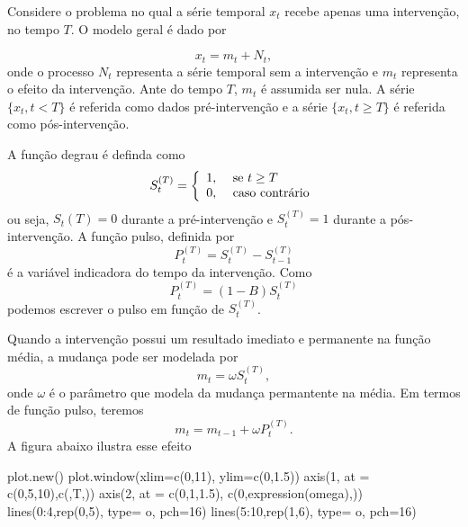 \documentclass[
  letterpaper,
  DIV=11,
  numbers=noendperiod]{scrartcl}
\newenvironment{Shaded}{\begin{snugshade}}{\end{snugshade}}
\newcommand{\AttributeTok}[1]{\textcolor[rgb]{0.40,0.45,0.13}{#1}}
\newcommand{\DecValTok}[1]{\textcolor[rgb]{0.68,0.00,0.00}{#1}}
\newcommand{\FloatTok}[1]{\textcolor[rgb]{0.68,0.00,0.00}{#1}}
\newcommand{\FunctionTok}[1]{\textcolor[rgb]{0.28,0.35,0.67}{#1}}
\newcommand{\NormalTok}[1]{\textcolor[rgb]{0.00,0.23,0.31}{#1}}
\newcommand{\SpecialCharTok}[1]{\textcolor[rgb]{0.37,0.37,0.37}{#1}}
\newcommand{\StringTok}[1]{\textcolor[rgb]{0.13,0.47,0.30}{#1}}
\theoremstyle{definition}
\theoremstyle{definition}
\theoremstyle{plain}
\theoremstyle{plain}
\theoremstyle{remark}
\begin{document}
Considere o problema no qual a série temporal \(x_t\) recebe apenas uma
intervenção, no tempo \(T\). O modelo geral é dado por

\[x_t=m_t+N_t,\] onde o processo \(N_t\) representa a série temporal sem
a intervenção e \(m_t\) representa o efeito da intervenção. Ante do
tempo \(T\), \(m_t\) é assumida ser nula. A série \(\{x_t,t<T\}\) é
referida como dados pré-intervenção e a série \(\{x_t,t\geq T\}\) é
referida como pós-intervenção.

A função degrau é definda como
\[S_t^{(T)}=\left\{\begin{array}{ll}1,&\hbox{ se }t\geq T\\ 0,&\hbox{ caso contrário}\end{array}\right.\]
ou seja, \(S_t(T)=0\) durante a pré-intervenção e \(S_t^(T)=1\) durante
a pós-intervenção. A função pulso, definida por
\[P^{(T)}_t=S_t^{(T)}-S_{t-1}^{(T)}\] é a variável indicadora do tempo
da intervenção. Como \[P_t^{(T)}=(1-B)S_t^{(T)}\] podemos escrever o
pulso em função de \(S_t^{(T)}\).

Quando a intervenção possui um resultado imediato e permanente na função
média, a mudança pode ser modelada por \[m_t=\omega S_t^{(T)},\] onde
\(\omega\) é o parâmetro que modela da mudança permantente na média. Em
termos de função pulso, teremos \[m_t=m_{t-1}+\omega P_t^{(T)}.\] A
figura abaixo ilustra esse efeito

\begin{Shaded}
\begin{Highlighting}[]
\FunctionTok{plot.new}\NormalTok{()}
\FunctionTok{plot.window}\NormalTok{(}\AttributeTok{xlim=}\FunctionTok{c}\NormalTok{(}\DecValTok{0}\NormalTok{,}\DecValTok{11}\NormalTok{), }\AttributeTok{ylim=}\FunctionTok{c}\NormalTok{(}\DecValTok{0}\NormalTok{,}\FloatTok{1.5}\NormalTok{))}
\FunctionTok{axis}\NormalTok{(}\DecValTok{1}\NormalTok{, }\AttributeTok{at =} \FunctionTok{c}\NormalTok{(}\DecValTok{0}\NormalTok{,}\DecValTok{5}\NormalTok{,}\DecValTok{10}\NormalTok{),}\FunctionTok{c}\NormalTok{(}\StringTok{\textquotesingle{}\textquotesingle{}}\NormalTok{,}\StringTok{\textquotesingle{}T\textquotesingle{}}\NormalTok{,}\StringTok{\textquotesingle{}\textquotesingle{}}\NormalTok{))}
\FunctionTok{axis}\NormalTok{(}\DecValTok{2}\NormalTok{, }\AttributeTok{at =} \FunctionTok{c}\NormalTok{(}\DecValTok{0}\NormalTok{,}\DecValTok{1}\NormalTok{,}\FloatTok{1.5}\NormalTok{), }\FunctionTok{c}\NormalTok{(}\DecValTok{0}\NormalTok{,}\FunctionTok{expression}\NormalTok{(omega),}\StringTok{\textquotesingle{}\textquotesingle{}}\NormalTok{))}
\FunctionTok{lines}\NormalTok{(}\DecValTok{0}\SpecialCharTok{:}\DecValTok{4}\NormalTok{,}\FunctionTok{rep}\NormalTok{(}\DecValTok{0}\NormalTok{,}\DecValTok{5}\NormalTok{), }\AttributeTok{type=} \StringTok{\textquotesingle{}o\textquotesingle{}}\NormalTok{, }\AttributeTok{pch=}\DecValTok{16}\NormalTok{)}
\FunctionTok{lines}\NormalTok{(}\DecValTok{5}\SpecialCharTok{:}\DecValTok{10}\NormalTok{,}\FunctionTok{rep}\NormalTok{(}\DecValTok{1}\NormalTok{,}\DecValTok{6}\NormalTok{), }\AttributeTok{type=} \StringTok{\textquotesingle{}o\textquotesingle{}}\NormalTok{, }\AttributeTok{pch=}\DecValTok{16}\NormalTok{)}
\end{Highlighting}
\end{Shaded}
\end{document}
